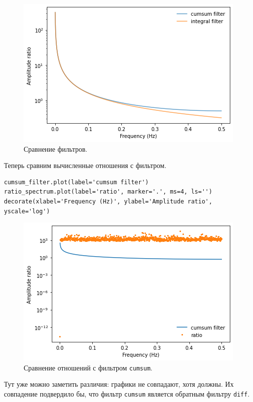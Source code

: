 \documentclass[a4paper, 14pt]{extarticle}
\begin{document}
    \begin{figure}[h]
        \centering
        \includegraphics[width=0.8\linewidth]{resources/Images/task1_cumsum_integ_filters}
        \caption{Сравнение фильтров.}
        \label{fig:task1_cumsum_integ_filters}
    \end{figure}

    Теперь сравним вычисленные отношения с фильтром.

    \begin{lstlisting}[caption= Сравнение отношений с фильтром., label={lst:task1_cumsum_filter_ratio_spectrum}]
cumsum_filter.plot(label='cumsum filter')
ratio_spectrum.plot(label='ratio', marker='.', ms=4, ls='')
decorate(xlabel='Frequency (Hz)', ylabel='Amplitude ratio', yscale='log')  \end{lstlisting}

    \begin{figure}[H]
        \centering
        \includegraphics[width=0.65\linewidth]{resources/Images/task1_cumsum_filter_ratio_spectrum}
        \caption{Сравнение отношений с фильтром \texttt{cumsum}.}
        \label{fig:task1_cumsum_filter_ratio_spectrum}
    \end{figure}

    Тут уже можно заметить различия: графики не совпадают, хотя должны. Их совпадение подвердило бы, что фильтр
    \texttt{cumsum} является обратным фильтру \texttt{diff}.
\end{document}
